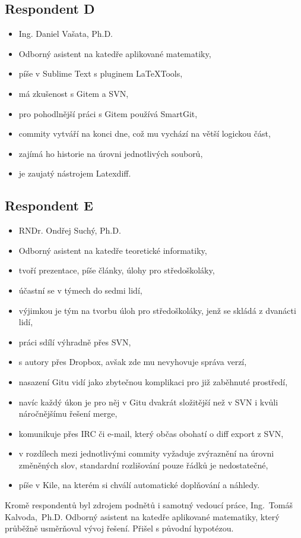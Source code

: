 \subsection{Respondent D}

\begin{itemize}
	\item Ing. Daniel Vašata, Ph.D.
	\item Odborný asistent na katedře aplikované matematiky,
	\item píše v Sublime Text s pluginem LaTeXTools,
	\item má zkušenost s Gitem a SVN,
	\item pro pohodlnější práci s Gitem používá SmartGit,
	\item commity vytváří na konci dne, což mu vychází na větší logickou část,
	\item zajímá ho historie na úrovni jednotlivých souborů,
	\item je zaujatý nástrojem Latexdiff.
\end{itemize}


\subsection{Respondent E}

\begin{itemize}
	\item RNDr. Ondřej Suchý, Ph.D.
	\item Odborný asistent na katedře teoretické informatiky,
	\item tvoří prezentace, píše články, úlohy pro středoškoláky,
	\item účastní se v týmech do sedmi lidí,
	\item výjimkou je tým na tvorbu úloh pro středoškoláky, jenž se skládá z dvanácti lidí,
	\item práci sdílí výhradně přes SVN,
	\item s  autory přes Dropbox, avšak zde mu nevyhovuje správa verzí,
	\item nasazení Gitu vidí jako zbytečnou komplikaci pro již zaběhnuté prostředí,
	\item navíc každý úkon je pro něj v Gitu dvakrát složitější než v SVN i kvůli náročnějšímu řešení merge,
	\item komunikuje přes IRC či e-mail, který občas obohatí o diff export z SVN,
	\item v rozdílech mezi jednotlivými commity vyžaduje zvýraznění na úrovni změněných slov, standardní rozlišování pouze řádků je nedostatečné,
	\item píše v Kile, na kterém si chválí automatické doplňování a náhledy.
\end{itemize}

Kromě respondentů byl zdrojem podnětů i samotný vedoucí práce, Ing.~Tomáš Kalvoda,~Ph.D. Odborný asistent na katedře aplikované matematiky, který průběžně usměrňoval vývoj řešení. Přišel s původní hypotézou.